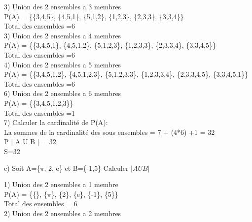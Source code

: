 3) Union des 2 ensembles a 3 membres \\

P(A) = \{\{3,4,5\}, \{4,5,1\}, \{5,1,2\}, \{1,2,3\}, \{2,3,3\}, \{3,3,4\}\} \\

Total des ensembles =6 \\

3) Union des 2 ensembles a 4 membres \\

P(A) = \{\{3,4,5,1\}, \{4,5,1,2\}, \{5,1,2,3\}, \{1,2,3,3\}, \{2,3,3,4\}, \{3,3,4,5\}\} \\

Total des ensembles =6 \\

4) Union des 2 ensembles a 5 membres \\

P(A) = \{\{3,4,5,1,2\}, \{4,5,1,2,3\}, \{5,1,2,3,3\}, \{1,2,3,3,4\}, \{2,3,3,4,5\}, \{3,3,4,5,1\}\} \\

Total des ensembles =6 \\

6) Union des 2 ensembles a 6 membres \\

P(A) = \{\{3,4,5,1,2,3\}\} \\

Total des ensembles =1 \\

7) Calculer la cardinalité de P(A):\\

La sommes de la cardinalité des sous ensembles = 7 + (4*6) +1 = 32\\

P $|$ A U B $|$ = 32 \\

S=32 \\

\newpage

c) Soit A=\{$\pi$, 2, e\} et B=\{-1,5\} Calculer $|A U B|$

1) Union des 2 ensembles a 1 membre \\

P(A) = \{\{\}, \{$\pi$\}, \{2\}, \{e\}, \{-1\}, \{5\}\} \\

Total des ensembles = 6 \\

2) Union des 2 ensembles a 2 membres \\

